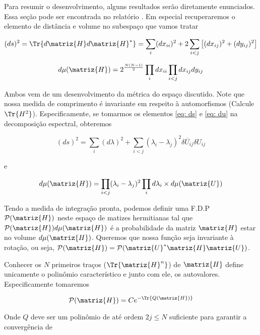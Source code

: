 Para resumir o desenvolvimento, alguns resultados serão diretamente enunciados. Essa seção pode ser encontrada no relatório \cite{fyodorov2010introduction}. Em especial recuperaremos o elemento de distância e volume no subespaço que vamos tratar

\begin{equation}
	(ds)^2 = \Tr{d\matriz{H} d\matriz{H}^*} = \sum_{i} (dx_{ii})^2 + 2 \sum_{i < j} \left[(dx_{ij})^2 + (dy_{ij})^2 \right]
	\label{eq: ds}
\end{equation}

\begin{equation}
	d\mu(\matriz{H}) = 2^{\frac{N(N-1)}{2}} \prod_{i} dx_{ii} \prod_{i<j} dx_{ij} dy_{ij}
	\label{eq: du}
\end{equation}

Ambos vem de um desenvolvimento da métrica do espaço discutido. Note que nossa medida de comprimento é invariante em respeito à automorfismos (Calcule  $\Tr{H^2}$). Especificamente, se tomarmos os elementos \eqref{eq: ds} e \eqref{eq: du} na decomposição espectral, obteremos

\begin{equation}
	(ds)^2 = \sum_{i} (d\lambda)^2 + \sum_{i<j} (\lambda_i - \lambda_j)^2 \overline{\delta U_{ij}} \delta U_{ij}
\end{equation}

e

\begin{equation}
	d\mu(\matriz{H}) = \prod_{i < j} (\lambda_i - \lambda_j)^2 \prod_{i} d\lambda_i \times d\mu(\matriz{U})
\end{equation}

Tendo a medida de integração pronta, podemos definir uma F.D.P $\mathcal{P}(\matriz{H})$ neste espaço de matizes hermitianas tal que $\mathcal{P}(\matriz{H}) d\mu(\matriz{H})$ é a probabilidade da matriz $\matriz{H}$  estar no volume $d\mu(\matriz{H})$. Queremos que nossa função seja invariante à rotação, ou seja, $\mathcal{P}(\matriz{H}) = \mathcal{P}( \matriz{U}^* \matriz{H} \matriz{U})$.

Conhecer os $N$ primeiros traços ($\Tr{\matriz{H}^n}$) de $\matriz{H}$ define unicamente o polinômio característico e junto com ele, os autovalores. Especificamente tomaremos 

\begin{equation}
	\mathcal{P}(\matriz{H}) = Ce^{-\Tr{Q(\matriz{H})}}
	\label{eq: p}
\end{equation}

Onde $Q$ deve ser um polinômio de até ordem $2j \leq N$ suficiente para garantir a convergência de

